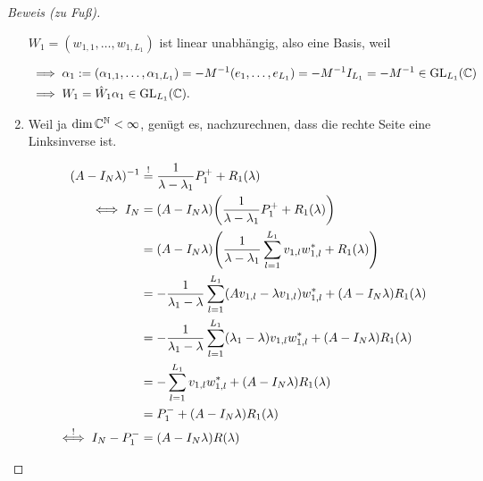\begin{proof}[Beweis (zu Fuß)]
\begin{enumerate}[label = (\roman*)]
        $W_1 = (w_{1, 1}, \dots, w_{1, L_1})$ ist linear unabhängig, also eine Basis, weil

        \begin{align*}
            & \implies
            \alpha_1
            :=
            (\alpha_{1, 1}, \dots, \alpha_{1, L_1})
            =
            -M^{-1} (e_1, \dots, e_{L_1})
            =
            -M^{-1} I_{L_1}
            =
            -M^{-1}
            \in
            \operatorname{GL}_{L_1}(\mathbb{C}) \\
            & \implies
            W_1
            =
            \hat W_1 \alpha_1
            \in
            \operatorname{GL}_{L_1}(\mathbb{C}).
        \end{align*}

        \item Weil ja $\dim \mathbb{C}^{\mathbb{N}} < \infty$, genügt es, nachzurechnen, dass die rechte Seite eine Linksinverse ist.
        
        \begin{align*}
            (A - I_N \lambda)^{-1}
            & \stackrel{!}{=}
            \frac{1}{\lambda - \lambda_1} P_1^+
            +
            R_1(\lambda) \\
            \iff
            I_N
            & =
            (A - I_N \lambda)
            {\left ( 
                \frac{1}{\lambda - \lambda_1} P_1^+
                +
                R_1(\lambda)
             \right )} \\
            & =
            (A - I_N \lambda)
            {\left ( 
                \frac{1}{\lambda - \lambda_1}
                \sum_{l=1}^{L_1}
                    v_{1, l} w_{1, l}^\ast
                +
                R_1(\lambda)
             \right )} \\
            & =
            -\frac{1}{\lambda_1 - \lambda}
            \sum_{l=1}^{L_1}
                (
                    A v_{1, l}
                    -
                    \lambda v_{1, l}
                )
                w_{1, l}^\ast
            +
            (A - I_N \lambda) R_1(\lambda) \\
            & =
            -\frac{1}{\lambda_1 - \lambda}
            \sum_{l=1}^{L_1}
                (\lambda_1 - \lambda) v_{1, l} w_{1, l}^\ast
            +
            (A - I_N \lambda)
            R_1(\lambda) \\
            & =
            -\sum_{l=1}^{L_1}
                v_{1, l} w_{1, l}^\ast
            +
            (A - I_N \lambda)
            R_1(\lambda) \\
            & =
            P_1^-
            +
            (A - I_N \lambda)
            R_1(\lambda) \\
            \stackrel{!}{\iff}
            I_N - P_1^-
            & =
            (A - I_N \lambda) R(\lambda)
        \end{align*}


\end{enumerate}
\end{proof}
